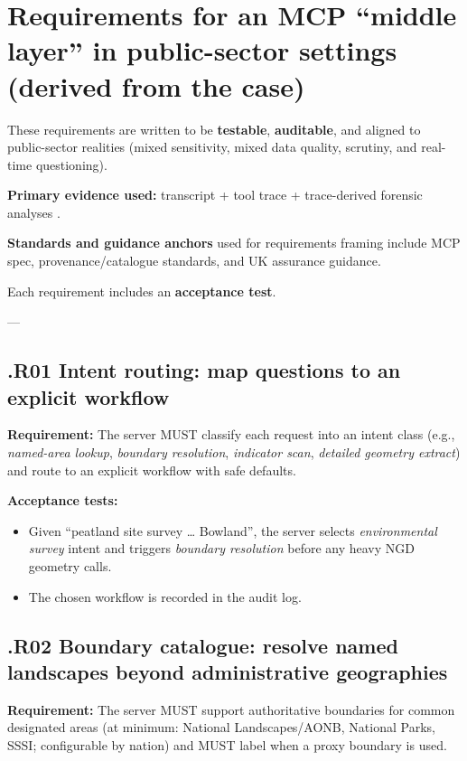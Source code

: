\section{Requirements for an MCP “middle layer” in public-sector settings (derived from the case)}

These requirements are written to be \textbf{testable}, \textbf{auditable}, and aligned to public-sector realities (mixed sensitivity, mixed data quality, scrutiny, and real-time questioning).

\textbf{Primary evidence used:} transcript + tool trace + trace-derived forensic analyses \cite{artefact_claude_stopped_after_ngd_features_2026_02_18,artefact_codex_trace_jsonl_2026_02_18,artefact_floor_question_analysis_2026_02_19,artefact_forensic_study_mcp_geo_2026_02_19}.

\textbf{Standards and guidance anchors} used for requirements framing include MCP spec, provenance/catalogue standards, and UK assurance guidance. \cite{mcp_spec_2025_11_25,prov_o,prov_dm,dcat3,ncsc_secure_ai_guidelines,ico_ai_data_protection,data_ai_ethics_framework,five_safes_framework,algorithmic_transparency_recording_standard,owasp_llm_top10}

Each requirement includes an \textbf{acceptance test}.

---

\subsection*{\thesection.R01 Intent routing: map questions to an explicit workflow}
\textbf{Requirement:} The server MUST classify each request into an intent class (e.g., \textit{named-area lookup}, \textit{boundary resolution}, \textit{indicator scan}, \textit{detailed geometry extract}) and route to an explicit workflow with safe defaults. \cite{mcp_spec_2025_11_25,owasp_llm_top10,ncsc_secure_ai_guidelines}

\textbf{Acceptance tests:}
\begin{itemize}[leftmargin=*]
\item Given “peatland site survey … Bowland”, the server selects \textit{environmental survey} intent and triggers \textit{boundary resolution} before any heavy NGD geometry calls.
\item The chosen workflow is recorded in the audit log.
\end{itemize}

\subsection*{\thesection.R02 Boundary catalogue: resolve named landscapes beyond administrative geographies}
\textbf{Requirement:} The server MUST support authoritative boundaries for common designated areas (at minimum: National Landscapes/AONB, National Parks, SSSI; configurable by nation) and MUST label when a proxy boundary is used. \cite{dcat3,data_ai_ethics_framework,algorithmic_transparency_recording_standard}

